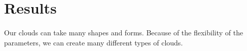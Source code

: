 \newpage
\section{Results}\paragraph{}
Our clouds can take many shapes and forms. Because of the flexibility of the parameters, we can create many different types of clouds.
